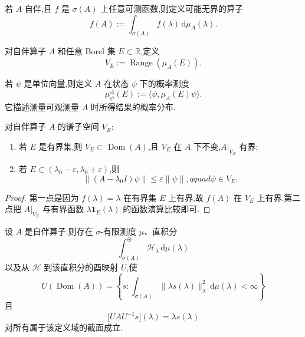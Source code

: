 \begin{definition}[无界函数演算]\label{def:unbounded-functional-calculus}
若 \(A\) 自伴,且 \(f\) 是 \(\sigma(A)\) 上任意可测函数,则定义可能无界的算子
\[
f(A):=\int_{\sigma(A)}f(\lambda)\,\mathrm{d}\mu_{A}(\lambda).
\]
\end{definition}

\begin{definition}[无界情形的谱子空间]\label{def:unbounded-spectral-subspace}
对自伴算子 \(A\) 和任意 Borel 集 \(E\subset\mathbb{R}\),定义
\[
V_{E}:=\operatorname{Range}(\mu_{A}(E)).
\]
\end{definition}

\begin{definition}[测量概率]\label{def:unbounded-measurement-probability}
若 \(\psi\) 是单位向量,则定义 \(A\) 在状态 \(\psi\) 下的概率测度
\[
\mu_{\psi}^{A}(E):=\langle\psi,\mu_{A}(E)\psi\rangle.
\]
它描述测量可观测量 \(A\) 时所得结果的概率分布.
\end{definition}

\begin{proposition}[无界谱子空间的性质]\label{prop:unbounded-spectral-subspaces}
对自伴算子 \(A\) 的谱子空间 \(V_{E}\):
\begin{enumerate}
\item 若 \(E\) 是有界集,则 \(V_{E}\subset\operatorname{Dom}(A)\),且 \(V_{E}\) 在 \(A\) 下不变,\(A|_{V_{E}}\) 有界;
\item 若 \(E\subset(\lambda_{0}-\varepsilon,\lambda_{0}+\varepsilon)\),则
\[
\|(A-\lambda_{0}I)\psi\|\leq\varepsilon\|\psi\|,qquad \psi\in V_{E}.
\]
\end{enumerate}
\end{proposition}

\begin{proof}
第一点是因为 \(f(\lambda)=\lambda\) 在有界集 \(E\) 上有界,故 \(f(A)\) 在 \(V_{E}\) 上有界.第二点把 \(A|_{V_{E}}\) 与有界函数 \(\lambda\mathbf{1}_{E}(\lambda)\) 的函数演算比较即可.
\end{proof}

\begin{theorem}\label{thm:unbounded-spectral-direct-integral}
设 \(A\) 是自伴算子.则存在 \(\sigma\)-有限测度 \(\mu\)、直积分
\[
\int_{\sigma(A)}^{\oplus}\mathcal{H}_{\lambda}\,\mathrm{d}\mu(\lambda)
\]
以及从 \(\mathcal{H}\) 到该直积分的酉映射 \(U\),使
\[
U(\operatorname{Dom}(A))
=\left\{s:\int_{\sigma(A)}\|\lambda s(\lambda)\|_{\lambda}^{2}\,\mathrm{d}\mu(\lambda)<\infty\right\}
\]
且
\[
\bigl[UAU^{-1}s\bigr](\lambda)=\lambda s(\lambda)
\]
对所有属于该定义域的截面成立.
\end{theorem}


